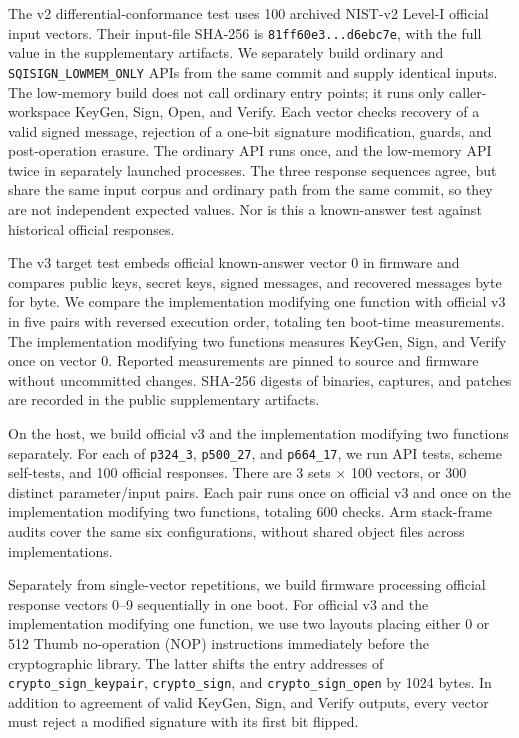 \documentclass[a4paper,10pt]{article}
\theoremstyle{definition}
\theoremstyle{remark}
\begin{document}
The v2 differential-conformance test uses 100 archived NIST-v2 Level-I official input vectors. Their input-file SHA-256 is \texttt{81ff60e3...d6ebc7e}, with the full value in the supplementary artifacts. We separately build ordinary and \texttt{SQISIGN\_LOWMEM\_ONLY} APIs from the same commit and supply identical inputs. The low-memory build does not call ordinary entry points; it runs only caller-workspace KeyGen, Sign, Open, and Verify. Each vector checks recovery of a valid signed message, rejection of a one-bit signature modification, guards, and post-operation erasure. The ordinary API runs once, and the low-memory API twice in separately launched processes. The three response sequences agree, but share the same input corpus and ordinary path from the same commit, so they are not independent expected values. Nor is this a known-answer test against historical official responses.

The v3 target test embeds official known-answer vector 0 in firmware and compares public keys, secret keys, signed messages, and recovered messages byte for byte. We compare the implementation modifying one function with official v3 in five pairs with reversed execution order, totaling ten boot-time measurements. The implementation modifying two functions measures KeyGen, Sign, and Verify once on vector 0. Reported measurements are pinned to source and firmware without uncommitted changes. SHA-256 digests of binaries, captures, and patches are recorded in the public supplementary artifacts.

On the host, we build official v3 and the implementation modifying two functions separately. For each of \texttt{p324\_3}, \texttt{p500\_27}, and \texttt{p664\_17}, we run API tests, scheme self-tests, and 100 official responses. There are 3 sets \(\times\) 100 vectors, or 300 distinct parameter/input pairs. Each pair runs once on official v3 and once on the implementation modifying two functions, totaling \num{600} checks. Arm stack-frame audits cover the same six configurations, without shared object files across implementations.

Separately from single-vector repetitions, we build firmware processing official response vectors 0--9 sequentially in one boot. For official v3 and the implementation modifying one function, we use two layouts placing either 0 or 512 Thumb no-operation (NOP) instructions immediately before the cryptographic library. The latter shifts the entry addresses of \texttt{crypto\_sign\_keypair}, \texttt{crypto\_sign}, and \texttt{crypto\_sign\_open} by \num{1024} bytes. In addition to agreement of valid KeyGen, Sign, and Verify outputs, every vector must reject a modified signature with its first bit flipped.
\end{document}

